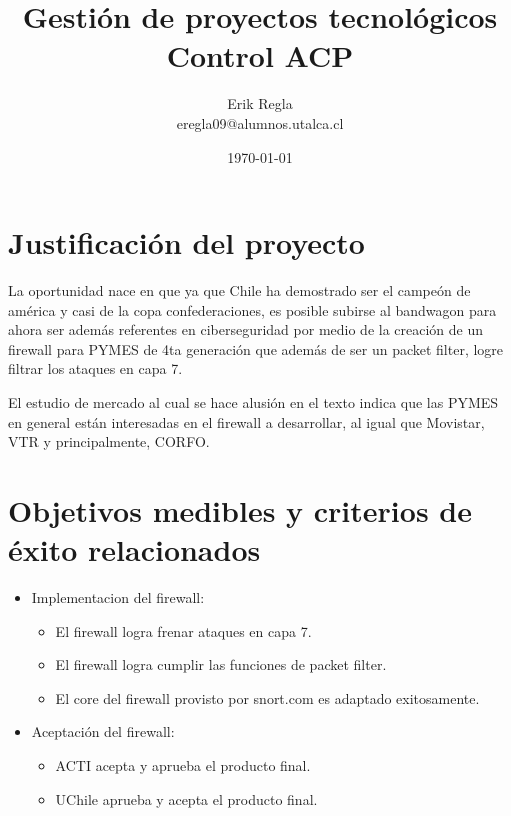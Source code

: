 \documentclass[11pt]{utalcaDoc}
\title{{\bf Gestión de proyectos tecnológicos}\\ Control ACP}
\author{Erik Regla\\ eregla09@alumnos.utalca.cl}
\date{\today}
\begin{document}
\maketitle

\section{Justificación del proyecto}
La oportunidad nace en que ya que Chile ha demostrado ser el campeón de américa y casi de la copa confederaciones, es posible subirse al bandwagon para ahora ser además referentes en ciberseguridad por medio de la creación de un firewall para PYMES de 4ta generación que además de ser un packet filter, logre filtrar los ataques en capa 7.

El estudio de mercado al cual se hace alusión en el texto indica que las PYMES en general están interesadas en el firewall a desarrollar, al igual que Movistar, VTR y principalmente, CORFO.

\section{Objetivos medibles y criterios de éxito relacionados}


\begin{itemize}
  \item{
    Implementacion del firewall:  
    \begin{itemize}
      \item { El firewall logra frenar ataques en capa 7. }
      \item { El firewall logra cumplir las funciones de packet filter.}
      \item { El core del firewall provisto por snort.com es adaptado exitosamente. }
    \end{itemize}
  }
  \item{
    Aceptación del firewall:
    \begin{itemize}
      \item { ACTI acepta y aprueba el producto final. }
      \item { UChile aprueba y acepta el producto final.}
    \end{itemize}
  }
\end{itemize}
\end{document}
